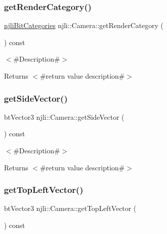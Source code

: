 \mbox{\label{classnjli_1_1_camera_afb526cf97416d6fcacb48aac9c906134}} 
\subsubsection{\texorpdfstring{get\+Render\+Category()}{getRenderCategory()}}
{\footnotesize\ttfamily \mbox{\hyperlink{namespacenjli_af7b302a2b48bb644f85c88080925c974}{njli\+Bit\+Categories}} njli\+::\+Camera\+::get\+Render\+Category (\begin{DoxyParamCaption}{ }\end{DoxyParamCaption}) const}

$<$\#\+Description\#$>$

\begin{DoxyReturn}{Returns}
$<$\#return value description\#$>$ 
\end{DoxyReturn}
\mbox{\label{classnjli_1_1_camera_a2099681caa7c779a5b0da74c1be3ee56}} 
\subsubsection{\texorpdfstring{get\+Side\+Vector()}{getSideVector()}}
{\footnotesize\ttfamily bt\+Vector3 njli\+::\+Camera\+::get\+Side\+Vector (\begin{DoxyParamCaption}{ }\end{DoxyParamCaption}) const}

$<$\#\+Description\#$>$

\begin{DoxyReturn}{Returns}
$<$\#return value description\#$>$ 
\end{DoxyReturn}
\mbox{\label{classnjli_1_1_camera_a39c4a0125df6b0d97cb43e381fd34a7b}} 
\subsubsection{\texorpdfstring{get\+Top\+Left\+Vector()}{getTopLeftVector()}}
{\footnotesize\ttfamily bt\+Vector3 njli\+::\+Camera\+::get\+Top\+Left\+Vector (\begin{DoxyParamCaption}{ }\end{DoxyParamCaption}) const\hspace{0.3cm}{\ttfamily [protected]}}

